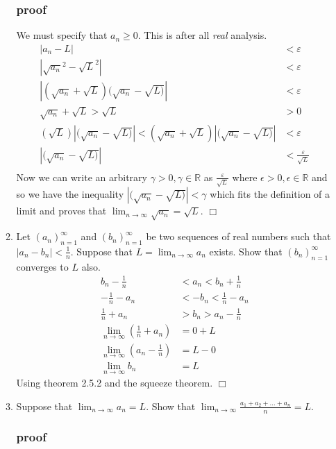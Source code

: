\documentclass[letterpaper]{article}
\begin{document}
\begin{enumerate}
\begin{enumerate}
  \subsubsection*{proof}
  We must specify that $a_n\ge0$. This is after all \emph{real} analysis.
  \begin{align*}
    \left\lvert a_n-L\right\rvert&<\varepsilon\\
    \left\lvert\sqrt{a_n}^2-\sqrt{L}^2\right\rvert&<\varepsilon\\
    \left\lvert(\sqrt{a_n}+\sqrt{L})(\sqrt{a_n}-\sqrt{L)}\right\rvert&<\varepsilon\\
    \sqrt{a_n}+\sqrt{L}>\sqrt{L}&>0\\
    (\sqrt{L})\left\lvert(\sqrt{a_n}-\sqrt{L)}\right\rvert<(\sqrt{a_n}+\sqrt{L})\left\lvert(\sqrt{a_n}-\sqrt{L)}\right\rvert&<\varepsilon\\
    \left\lvert(\sqrt{a_n}-\sqrt{L)}\right\rvert&<\frac{\varepsilon}{\sqrt{L}}\\
  \end{align*}
  Now we can write an arbitrary $\gamma>0,\gamma\in\mathbb{R}$ as $\frac{\varepsilon}{\sqrt{L}}$ where $\epsilon>0,\epsilon\in\mathbb{R}$ and so we have the inequality $\left\lvert(\sqrt{a_n}-\sqrt{L)}\right\rvert<\gamma$ which fits the definition of a limit and proves that $\displaystyle \lim_{n\to\infty}\sqrt{a_n}=\sqrt{L}$. $\Box$
  \item
  Let $(a_n)_{n=1}^\infty$ and $(b_n)_{n=1}^\infty$ be two sequences of real numbers such that $|a_n-b_n|<\frac{1}{n}$. Suppose that $\displaystyle L=\lim_{n\to\infty}a_n$ exists. Show that $(b_n)_{n=1}^\infty$ converges to $L$ also.
  \begin{align*}
    b_n-\frac{1}{n}&<a_n<b_n+\frac{1}{n}\\
    -\frac{1}{n}-a_n&<-b_n<\frac{1}{n}-a_n\\
    \frac{1}{n}+a_n&>b_n>a_n-\frac{1}{n}\\
    \lim_{n\to\infty}\left(\frac{1}{n}+a_n\right)&=0+L\\
    \lim_{n\to\infty}\left(a_n-\frac{1}{n}\right)&=L-0\\
    \lim_{n\to\infty}b_n&=L
  \end{align*}
  Using theorem 2.5.2 and the squeeze theorem. $\Box$
  \setcounter{enumii}{8}
  \item
  Suppose that $\displaystyle \lim_{n\to\infty} a_n=L$. Show that $\displaystyle \lim_{n\to\infty}\frac{a_1+a_2+\dots+a_n}{n}=L$.
  \subsubsection*{proof}
  \end{enumerate}
\end{enumerate}
\end{document}
